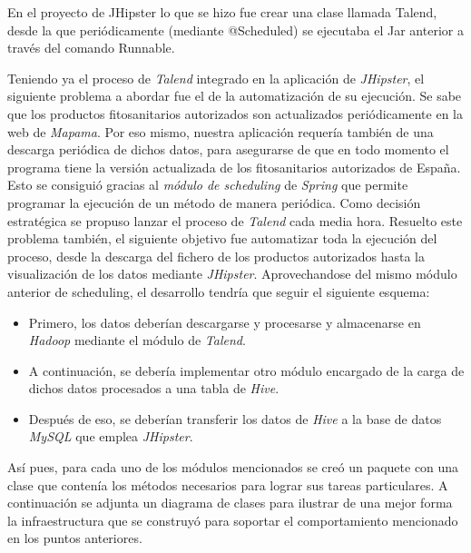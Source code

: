 En el proyecto de JHipster lo que se hizo fue crear una clase llamada Talend, desde la que periódicamente (mediante @Scheduled) se ejecutaba el Jar anterior a través del comando Runnable. 

\par
Teniendo ya el proceso de \textit{Talend} integrado en la aplicación de \textit{JHipster}, el siguiente problema a abordar fue el de la automatización de su ejecución. Se sabe que los productos fitosanitarios autorizados son actualizados periódicamente en la web de \textit{Mapama}. Por eso mismo, nuestra aplicación requería también de una descarga periódica de dichos datos, para asegurarse de que en todo momento el programa tiene la versión actualizada de los fitosanitarios autorizados de España. Esto se consiguió gracias al \textit{módulo de scheduling}\cite{spring_scheduling} de \textit{Spring} que permite programar la ejecución de un método de manera periódica. Como decisión estratégica se propuso lanzar el proceso de \textit{Talend} cada media hora. Resuelto este problema también, el siguiente objetivo fue automatizar toda la ejecución del proceso, desde la descarga del fichero de los productos autorizados hasta la visualización de los datos mediante \textit{JHipster}. Aprovechandose del mismo módulo anterior de scheduling, el desarrollo tendría que seguir el siguiente esquema: 
\begin{itemize}
\item Primero, los datos deberían descargarse y procesarse y almacenarse en \textit{Hadoop} mediante el módulo de \textit{Talend}.
\item A continuación, se debería implementar otro módulo encargado de la carga de dichos datos procesados a una tabla de \textit{Hive}.
\item Después de eso, se deberían transferir los datos de \textit{Hive} a la base de datos \textit{MySQL} que emplea \textit{JHipster}.
\end{itemize}
  \par Así pues, para cada uno de los módulos mencionados se creó un paquete con una clase que contenía los métodos necesarios para lograr sus tareas particulares. A continuación se adjunta un diagrama de clases para ilustrar de una mejor forma la infraestructura que se construyó para soportar el comportamiento mencionado en los puntos anteriores.


